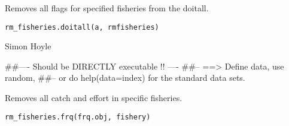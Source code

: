 \documentclass[a4paper]{book}
\begin{document}
%
\begin{Description}\relax

Removes all flags for specified fisheries from the doitall. 
\end{Description}
%
\begin{Usage}
\begin{verbatim}
rm_fisheries.doitall(a, rmfisheries)
\end{verbatim}
\end{Usage}
%
\begin{Arguments}
\begin{ldescription}
\item[\code{a}] 


\item[\code{rmfisheries}] 


\end{ldescription}
\end{Arguments}
%
\begin{Author}\relax

Simon Hoyle
\end{Author}
%
\begin{Examples}
\begin{ExampleCode}
##---- Should be DIRECTLY executable !! ----
##-- ==>  Define data, use random,
##--	or do  help(data=index)  for the standard data sets.

\end{ExampleCode}
\end{Examples}
%
\begin{Description}\relax

Removes all catch and effort in specific fisheries. 
\end{Description}
%
\begin{Usage}
\begin{verbatim}
rm_fisheries.frq(frq.obj, fishery)
\end{verbatim}
\end{Usage}
%
\begin{Arguments}
\begin{ldescription}
\item[\code{frq.obj}] 


\item[\code{fishery}] 


\end{ldescription}
\end{Arguments}
\end{document}
